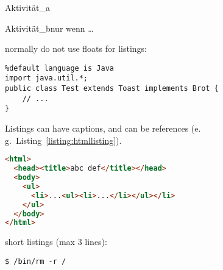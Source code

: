 \begin{activity}{Aktivität\_a}{}
    \lipsum[18-19]
\end{activity}

\begin{activity}{Aktivität\_b}{nur wenn \dots}
    \lipsum[20]
\end{activity}

normally do not use floats for listings:
\begin{lstlisting}%default language is Java
import java.util.*;
public class Test extends Toast implements Brot {
    // ...
}
\end{lstlisting}

Listings can have captions, and can be references (e.\,g.~Listing~\ref{listing:htmllisting}).
\begin{lstlisting}[language=HTML, caption={sourcecode in different languages possible, can have a caption}, label=listing:htmllisting]
<html>
  <head><title>abc def</title></head>
  <body>
    <ul>
      <li>...<ul><li>...</li></ul></li>
    </ul>
  </body>
</html>
\end{lstlisting}

short listings (max 3 lines):
\begin{lstlisting}[style=nonumbers]
$ /bin/rm -r /
\end{lstlisting}

